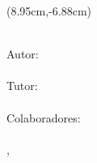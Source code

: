 \begin{titlepage}
\vfill

\begin{textblock*}{7.35cm}(8.95cm,-6.88cm)%
\begin{flushleft}
 {\ArialBoldItalicMT\fontsize{10pt}{12pt}
 {\addfontfeature{}
 {\MakeUppercase\tipotrabajo}}}\\[0.41cm]
 {\ArialMT\fontsize{10pt}{12pt}
 {\addfontfeature{}
 Autor:}}\\ 
 {\ArialBoldMT\fontsize{10pt}{12pt}
 {\addfontfeature{}
 {\miNombre}}
 }\\[0.26cm]

 {\ArialMT\fontsize{10pt}{12pt}
 {\addfontfeature{}
 Tutor:}}\\ 
 {\ArialBoldMT\fontsize{10pt}{12pt}
 {\addfontfeature{}
 {\miTutor}}
 }\\[0.26cm]

 {\ArialMT\fontsize{10pt}{12pt}
 {\addfontfeature{}
 Colaboradores:}}\\ 
 {\ArialBoldMT\fontsize{10pt}{12pt}
 {\addfontfeature{}
 {\colaboradores}}
 }\\[0.26cm]

 {\ArialBoldItalicMT\fontsize{10pt}{12pt}
 {\addfontfeature{}
 {\MakeUppercase \miUbicacion, \number\year}}}
\end{flushleft}
\end{textblock*}



\end{titlepage} %

\restoregeometry


